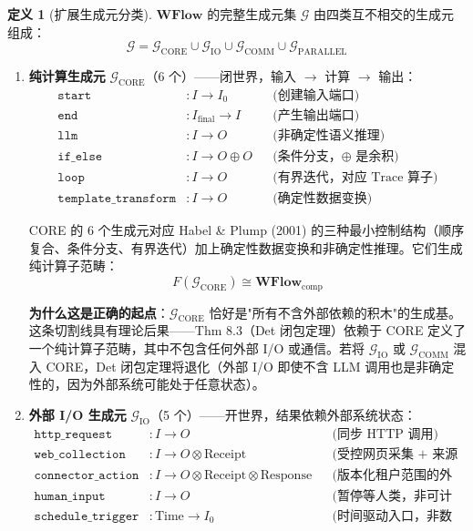 \documentclass[11pt,a4paper]{article}
\theoremstyle{definition}
\theoremstyle{definition}
\newtheorem{definition}[theorem]{定义}
\theoremstyle{remark}
\newcommand{\cat}[1]{\mathbf{#1}}
\newcommand{\catWFlow}{\cat{WFlow}}
\begin{document}
\begin{definition}[扩展生成元分类]
$\catWFlow$ 的完整生成元集 $\mathcal{G}$ 由四类互不相交的生成元组成：
\[
\mathcal{G} = \mathcal{G}_{\mathrm{CORE}} \cup \mathcal{G}_{\mathrm{IO}} \cup \mathcal{G}_{\mathrm{COMM}} \cup \mathcal{G}_{\mathrm{PARALLEL}}
\]
\end{definition}

\begin{enumerate}[leftmargin=2em,label=\textbf{类别 \arabic*:}]

\item \textbf{纯计算生成元} $\mathcal{G}_{\mathrm{CORE}}$（6 个）——闭世界，输入 $\to$ 计算 $\to$ 输出：
\[
\begin{aligned}
\mathtt{start}&: I \to I_0                  &&\text{(创建输入端口)} \\
\mathtt{end}&: I_{\mathrm{final}} \to I     &&\text{(产生输出端口)} \\
\mathtt{llm}&: I \to O                      &&\text{(非确定性语义推理)} \\
\mathtt{if\_else}&: I \to O \oplus O        &&\text{(条件分支，$\oplus$ 是余积)} \\
\mathtt{loop}&: I \to O                     &&\text{(有界迭代，对应 Trace 算子)} \\
\mathtt{template\_transform}&: I \to O      &&\text{(确定性数据变换)}
\end{aligned}
\]

CORE 的 6 个生成元对应 Habel \& Plump (2001) 的三种最小控制结构（顺序复合、条件分支、有界迭代）加上确定性数据变换和非确定性推理。它们生成纯计算子范畴：
\[
F(\mathcal{G}_{\mathrm{CORE}}) \cong \catWFlow_{\mathrm{comp}}
\]

\textbf{为什么这是正确的起点}：$\mathcal{G}_{\mathrm{CORE}}$ 恰好是"所有不含外部依赖的积木"的生成基。这条切割线具有理论后果——Thm 8.3（Det 闭包定理）依赖于 CORE 定义了一个纯计算子范畴，其中不包含任何外部 I/O 或通信。若将 $\mathcal{G}_{\mathrm{IO}}$ 或 $\mathcal{G}_{\mathrm{COMM}}$ 混入 CORE，Det 闭包定理将退化（外部 I/O 即使不含 LLM 调用也是非确定性的，因为外部系统可能处于任意状态）。

\item \textbf{外部 I/O 生成元} $\mathcal{G}_{\mathrm{IO}}$（5 个）——开世界，结果依赖外部系统状态：
\[
\begin{aligned}
\mathtt{http\_request}&: I \to O                                  &&\text{(同步 HTTP 调用)} \\
\mathtt{web\_collection}&: I \to O \otimes \mathrm{Receipt}       &&\text{(受控网页采集 + 来源证据)} \\
\mathtt{connector\_action}&: I \to O \otimes \mathrm{Receipt} \otimes \mathrm{Response}
                        &&\text{(版本化租户范围的外部系统操作)} \\
\mathtt{human\_input}&: I \to O                                    &&\text{(暂停等人类，非可计算函数)} \\
\mathtt{schedule\_trigger}&: \mathrm{Time} \to I_0                 &&\text{(时间驱动入口，非数据驱动)}
\end{aligned}
\]


\end{enumerate}
\end{document}
